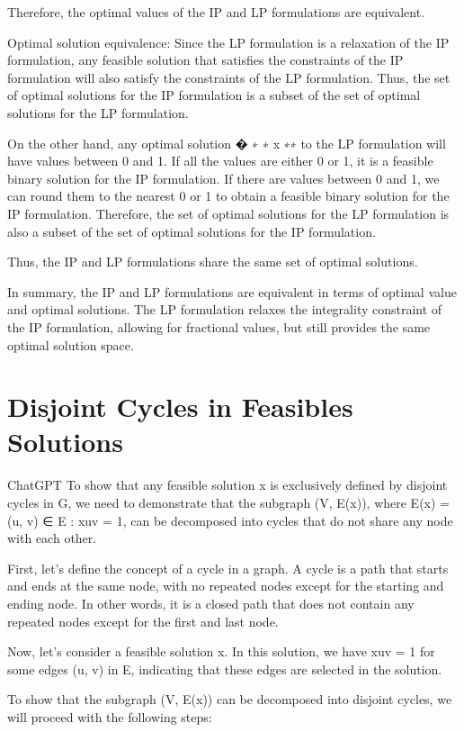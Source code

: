 \documentclass{ULBreport}
\begin{document}
Therefore, the optimal values of the IP and LP formulations are equivalent.

Optimal solution equivalence:
Since the LP formulation is a relaxation of the IP formulation, any feasible solution that satisfies the constraints of the IP formulation will also satisfy the constraints of the LP formulation. Thus, the set of optimal solutions for the IP formulation is a subset of the set of optimal solutions for the LP formulation.

On the other hand, any optimal solution 
�
∗
∗
x 
∗∗
  to the LP formulation will have values between 0 and 1. If all the values are either 0 or 1, it is a feasible binary solution for the IP formulation. If there are values between 0 and 1, we can round them to the nearest 0 or 1 to obtain a feasible binary solution for the IP formulation. Therefore, the set of optimal solutions for the LP formulation is also a subset of the set of optimal solutions for the IP formulation.

Thus, the IP and LP formulations share the same set of optimal solutions.

In summary, the IP and LP formulations are equivalent in terms of optimal value and optimal solutions. The LP formulation relaxes the integrality constraint of the IP formulation, allowing for fractional values, but still provides the same optimal solution space.

\section{Disjoint Cycles in Feasibles Solutions}


ChatGPT
To show that any feasible solution x is exclusively defined by disjoint cycles in G, we need to demonstrate that the subgraph (V, E(x)), where E(x) = {(u, v) ∈ E : xuv = 1}, can be decomposed into cycles that do not share any node with each other.

First, let's define the concept of a cycle in a graph. A cycle is a path that starts and ends at the same node, with no repeated nodes except for the starting and ending node. In other words, it is a closed path that does not contain any repeated nodes except for the first and last node.

Now, let's consider a feasible solution x. In this solution, we have xuv = 1 for some edges (u, v) in E, indicating that these edges are selected in the solution.

To show that the subgraph (V, E(x)) can be decomposed into disjoint cycles, we will proceed with the following steps:
\end{document}
